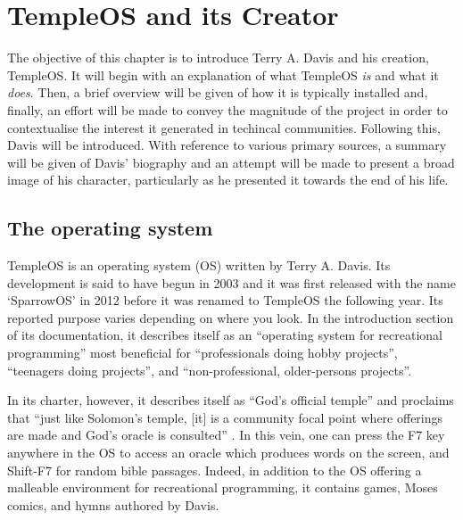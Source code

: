 \documentclass[Draft.tex]{subfiles}
\begin{document}
\chapter{TempleOS and its Creator}

The objective of this chapter is to introduce Terry A. Davis
and his creation, TempleOS.
It will begin with an explanation of what TempleOS \textit{is}
and what it \textit{does}.
Then, a brief overview will be given of how it is typically installed
and, finally, an effort will be made to convey
the magnitude of the project in order to contextualise
the interest it generated in techincal communities.
Following this, Davis will be introduced.
With reference to various primary sources,
a summary will be given of Davis' biography and
an attempt will be made to present a broad image of his character,
particularly as he presented it towards the end of his life.

\section*{The operating system}

TempleOS is an operating system (OS) written by Terry A. Davis.
Its development is said to have begun in 2003
and it was first released with the name `SparrowOS' in 2012
before it was renamed to TempleOS the following year.
Its reported purpose varies depending on where you look.
In the introduction section of its documentation, it describes itself as
an ``operating system for recreational programming'' most beneficial for
``professionals doing hobby projects'', ``teenagers doing projects'',
and ``non-professional, older-persons projects''.

In its charter, however, it describes itself as ``God's official temple''
and proclaims that
``just like Solomon’s temple, [it] is a community focal point
where offerings are made and God’s oracle is consulted''
\parencite{Charter}\footnotemark.
In this vein, one can press the F7 key anywhere in the OS
to access an oracle which produces words on the screen,
and Shift-F7 for random bible passages.
Indeed, in addition to the OS offering
a malleable environment for recreational programming,
it contains games, Moses comics, and hymns authored by Davis.

\end{document}

